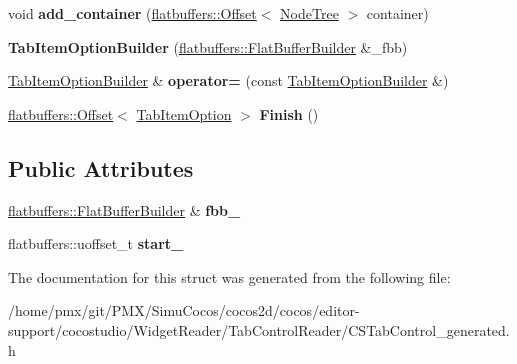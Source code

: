 \begin{DoxyCompactItemize}
\item 
\mbox{\label{structflatbuffers_1_1TabItemOptionBuilder_a92299ae08c12df0f6c9ceb4b5db5161c}} 
void {\bfseries add\+\_\+container} (\hyperlink{structflatbuffers_1_1Offset}{flatbuffers\+::\+Offset}$<$ \hyperlink{structflatbuffers_1_1NodeTree}{Node\+Tree} $>$ container)
\item 
\mbox{\label{structflatbuffers_1_1TabItemOptionBuilder_a2ee0b5d530f354a7523aa73f0b620458}} 
{\bfseries Tab\+Item\+Option\+Builder} (\hyperlink{classflatbuffers_1_1FlatBufferBuilder}{flatbuffers\+::\+Flat\+Buffer\+Builder} \&\+\_\+fbb)
\item 
\mbox{\label{structflatbuffers_1_1TabItemOptionBuilder_ab95fedd48218a526a088e32ac600a40f}} 
\hyperlink{structflatbuffers_1_1TabItemOptionBuilder}{Tab\+Item\+Option\+Builder} \& {\bfseries operator=} (const \hyperlink{structflatbuffers_1_1TabItemOptionBuilder}{Tab\+Item\+Option\+Builder} \&)
\item 
\mbox{\label{structflatbuffers_1_1TabItemOptionBuilder_ab95a25f30e50d0ba0e956e5ddd767364}} 
\hyperlink{structflatbuffers_1_1Offset}{flatbuffers\+::\+Offset}$<$ \hyperlink{structflatbuffers_1_1TabItemOption}{Tab\+Item\+Option} $>$ {\bfseries Finish} ()
\end{DoxyCompactItemize}
\subsection*{Public Attributes}
\begin{DoxyCompactItemize}
\item 
\mbox{\label{structflatbuffers_1_1TabItemOptionBuilder_a7798f07a8d8454b21ea8c4e911eca271}} 
\hyperlink{classflatbuffers_1_1FlatBufferBuilder}{flatbuffers\+::\+Flat\+Buffer\+Builder} \& {\bfseries fbb\+\_\+}
\item 
\mbox{\label{structflatbuffers_1_1TabItemOptionBuilder_a6e3b3ec1ce6f596b2f6b2a6d719f9c6c}} 
flatbuffers\+::uoffset\+\_\+t {\bfseries start\+\_\+}
\end{DoxyCompactItemize}


The documentation for this struct was generated from the following file\+:\begin{DoxyCompactItemize}
\item 
/home/pmx/git/\+P\+M\+X/\+Simu\+Cocos/cocos2d/cocos/editor-\/support/cocostudio/\+Widget\+Reader/\+Tab\+Control\+Reader/C\+S\+Tab\+Control\+\_\+generated.\+h\end{DoxyCompactItemize}
